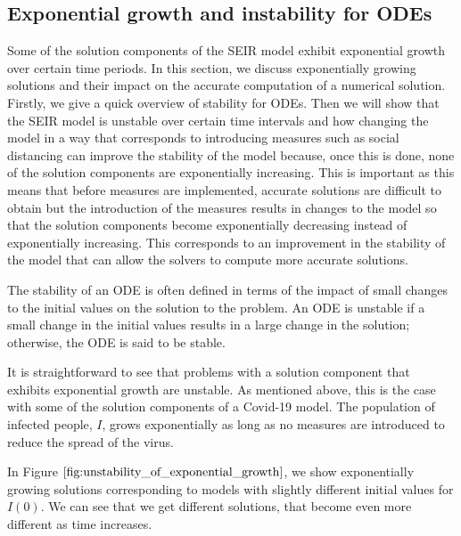 \subsection{Exponential growth and instability for ODEs}
\label{subsection:exponential_growth}
Some of the solution components of the SEIR model exhibit exponential growth over certain time periods. In this section, we discuss exponentially growing solutions and their impact on the accurate computation of a numerical solution. Firstly, we give a quick overview of stability for ODEs. Then we will show that the SEIR model is unstable over certain time intervals and how changing the model in a way that corresponds to introducing measures such as social distancing can improve the stability of the model because, once this is done, none of the solution components are exponentially increasing. This is important as this  means that before measures are implemented, accurate solutions are difficult to obtain but the introduction of the measures results in changes to the model so that the solution components become exponentially decreasing instead of exponentially increasing. This corresponds to an improvement in the stability 
of the model that can allow the solvers to compute more accurate solutions.

The stability of an ODE is often defined in terms of the impact of small changes to the initial values on the solution to the problem. An ODE is unstable if a small change in the initial values results in a large change in the solution; otherwise, the ODE is said to be stable.

It is straightforward to see that problems with a solution component that exhibits exponential growth are unstable. As mentioned above, this is the case with some of the solution components of a Covid-19 model. The population of infected people, $I$, grows exponentially as long as no measures are introduced to reduce the spread of the virus. 

In Figure $\ref{fig:unstability_of_exponential_growth}$, we show exponentially growing solutions corresponding to models with slightly different initial values for $I(0)$. We can see that we get different solutions, that become even more different as time increases.

